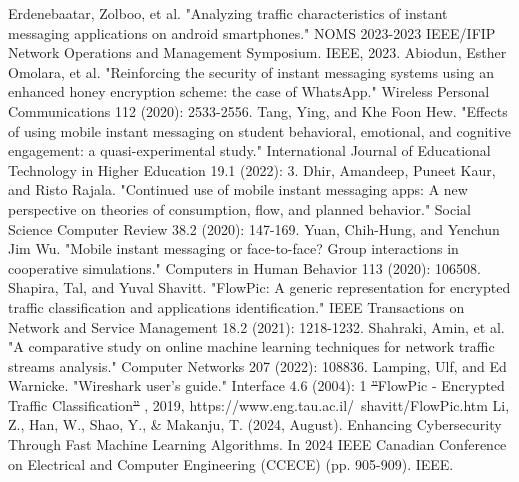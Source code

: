 \documentclass[conference]{IEEEtran}
\makeatletter
\providecommand{\DIFadd}[1]{{\protect\color{blue}\uwave{#1}}} %
\providecommand{\DIFdel}[1]{{\protect\color{red}\sout{#1}}} %
\providecommand{\DIFaddbegin}{} %
\providecommand{\DIFaddend}{} %
\providecommand{\DIFdelbegin}{} %
\providecommand{\DIFdelend}{} %
\newcommand{\DIFscaledelfig}{0.5}
\newlength{\DIFdelgraphicswidth} %
\newlength{\DIFdelgraphicsheight} %
\newcommand{\DIFaddincludegraphics}[2][]{{\color{blue}\fbox{\DIFOincludegraphics[#1]{#2}}}} %
\newcommand{\DIFdelincludegraphics}[2][]{%
\sbox{\DIFdelgraphicsbox}{\DIFOincludegraphics[#1]{#2}}%
\settoboxwidth{\DIFdelgraphicswidth}{\DIFdelgraphicsbox} %
\settoboxtotalheight{\DIFdelgraphicsheight}{\DIFdelgraphicsbox} %
\scalebox{\DIFscaledelfig}{%
\parbox[b]{\DIFdelgraphicswidth}{\usebox{\DIFdelgraphicsbox}\\[-\baselineskip] \rule{\DIFdelgraphicswidth}{0em}}\llap{\resizebox{\DIFdelgraphicswidth}{\DIFdelgraphicsheight}{%
\setlength{\unitlength}{\DIFdelgraphicswidth}%
\begin{picture}(1,1)%
\thicklines\linethickness{2pt} %
{\color[rgb]{1,0,0}\put(0,0){\framebox(1,1){}}}%
{\color[rgb]{1,0,0}\put(0,0){\line( 1,1){1}}}%
{\color[rgb]{1,0,0}\put(0,1){\line(1,-1){1}}}%
\end{picture}%
}\hspace*{3pt}}} %
} %
\DeclareRobustCommand{\DIFaddbegin}{\DIFOaddbegin \let\includegraphics\DIFaddincludegraphics} %
\DeclareRobustCommand{\DIFaddend}{\DIFOaddend \let\includegraphics\DIFOincludegraphics} %
\DeclareRobustCommand{\DIFdelbegin}{\DIFOdelbegin \let\includegraphics\DIFdelincludegraphics} %
\DeclareRobustCommand{\DIFdelend}{\DIFOaddend \let\includegraphics\DIFOincludegraphics} %
\let\sout@orig\sout %
\renewcommand{\sout}[1]{\ifmmode\text{\sout@orig{\ensuremath{#1}}}\else\sout@orig{#1}\fi} %
\makeatother
\begin{document}
\DIFdelend \begin{thebibliography}{00}
 Erdenebaatar, Zolboo, et al. "Analyzing traffic characteristics of instant messaging applications on android smartphones." NOMS 2023-2023 IEEE/IFIP Network Operations and Management Symposium. IEEE, 2023.
 Abiodun, Esther Omolara, et al. "Reinforcing the security of instant messaging systems using an enhanced honey encryption scheme: the case of WhatsApp." Wireless Personal Communications 112 (2020): 2533-2556.
 Tang, Ying, and Khe Foon Hew. "Effects of using mobile instant messaging on student behavioral, emotional, and cognitive engagement: a quasi-experimental study." International Journal of Educational Technology in Higher Education 19.1 (2022): 3.
 Dhir, Amandeep, Puneet Kaur, and Risto Rajala. "Continued use of mobile instant messaging apps: A new perspective on theories of consumption, flow, and planned behavior." Social Science Computer Review 38.2 (2020): 147-169.
 Yuan, Chih-Hung, and Yenchun Jim Wu. "Mobile instant messaging or face-to-face? Group interactions in cooperative simulations." Computers in Human Behavior 113 (2020): 106508.
 Shapira, Tal, and Yuval Shavitt. "FlowPic: A generic representation for encrypted traffic classification and applications identification." IEEE Transactions on Network and Service Management 18.2 (2021): 1218-1232.
 Shahraki, Amin, et al. "A comparative study on online machine learning techniques for network traffic streams analysis." Computer Networks 207 (2022): 108836.
 Lamping, Ulf, and Ed Warnicke. "Wireshark user's guide." Interface 4.6 (2004): 1
 \DIFdelbegin \DIFdel{”}\DIFdelend \DIFaddbegin \DIFadd{"}\DIFaddend FlowPic - Encrypted Traffic Classification\DIFdelbegin \DIFdel{” }\DIFdelend \DIFaddbegin \DIFadd{" }\DIFaddend , 2019, https://www.eng.tau.ac.il/~shavitt/FlowPic.htm
 Li, Z., Han, W., Shao, Y., \& Makanju, T. (2024, August). Enhancing Cybersecurity Through Fast Machine Learning Algorithms. In 2024 IEEE Canadian Conference on Electrical and Computer Engineering (CCECE) (pp. 905-909). IEEE.
\DIFdelbegin %

\DIFdelend \end{thebibliography}
\end{document}

